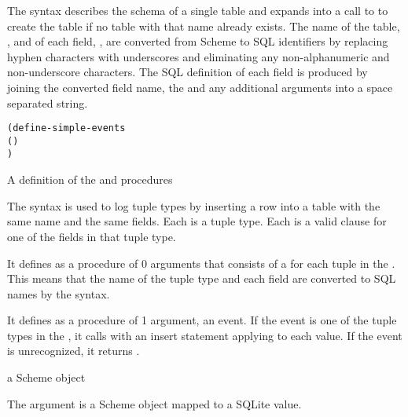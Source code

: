 The  syntax describes the schema of a single
table and expands into a call to  to create the table
if no table with that name already exists. The name of the table,
, and of each field, , are converted from Scheme
to SQL identifiers by replacing hyphen characters with underscores and
eliminating any non-alphanumeric and non-underscore characters. The
SQL definition of each field is produced by joining the converted
field name, the  and any additional  arguments
into a space separated string.

\begin{syntax}\begin{alltt}
(define-simple-events  
  (  \etc{})
  \etc{})\strut\end{alltt}
\end{syntax}
\expandsto{} A definition of the  and 
procedures

The  syntax is used to log tuple types
by inserting a row into a table with the same name and the same
fields. Each  is a tuple type. Each  is a valid
 clause for one of the fields in that tuple
type.

It defines  as a procedure of 0 arguments that consists of
a  for each
tuple in the . This means that the name
of the tuple type and each field are converted to SQL names by the
 syntax.

It defines  as a procedure of 1 argument, an event. If the
event is one of the tuple types in the , it
calls  with an insert statement applying  to
each value. If the event is unrecognized, it returns .

\begin{procedure}
\end{procedure}
\returns{} a Scheme object

The argument  is a Scheme object mapped to a SQLite value.

